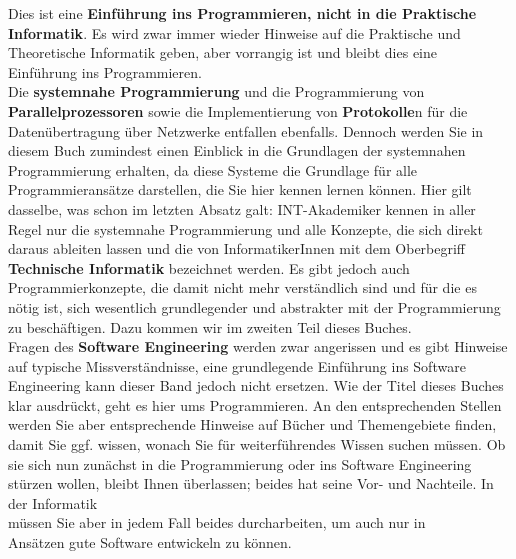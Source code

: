 Dies ist eine \textbf{Einführung ins Programmieren, nicht in die Praktische Informatik}. Es wird zwar immer wieder Hinweise auf die Praktische und Theoretische Informatik geben, aber vorrangig ist und bleibt dies eine\\
Einführung ins Programmieren.\\

Die \textbf{systemnahe Programmierung} und die Programmierung von \textbf{Parallelprozessoren} sowie die Implementierung von \textbf{Protokolle}n für die Datenübertragung über Netzwerke entfallen ebenfalls. Dennoch werden Sie in diesem Buch zumindest einen Einblick in die Grundlagen der systemnahen Programmierung erhalten, da diese Systeme die Grundlage für alle Programmieransätze darstellen, die Sie hier kennen lernen können. Hier gilt dasselbe, was schon im letzten Absatz galt: INT-Akademiker kennen in aller Regel nur die systemnahe Programmierung und alle Konzepte, die sich direkt daraus ableiten lassen und die von InformatikerInnen mit dem Oberbegriff \textbf{Technische Informatik} bezeichnet werden. Es gibt jedoch auch Programmierkonzepte, die damit nicht mehr verständlich sind und für die es nötig ist, sich wesentlich grundlegender und abstrakter mit der Programmierung zu beschäftigen. Dazu kommen wir im zweiten Teil dieses Buches.\\

Fragen des \textbf{Software Engineering} werden zwar angerissen und es gibt Hinweise auf typische Missverständnisse, eine grundlegende Einführung ins Software Engineering kann dieser Band jedoch nicht ersetzen. Wie der Titel dieses Buches klar ausdrückt, geht es hier ums Programmieren. An den entsprechenden Stellen werden Sie aber entsprechende Hinweise auf Bücher und Themengebiete finden, damit Sie ggf. wissen, wonach Sie für weiterführendes Wissen suchen müssen. Ob sie sich nun zunächst in die Programmierung oder ins Software Engineering stürzen wollen, bleibt Ihnen überlassen; beides hat seine Vor- und Nachteile. In der Informatik\\
müssen Sie aber in jedem Fall beides durcharbeiten, um auch nur in\\
Ansätzen gute Software entwickeln zu können.\\

